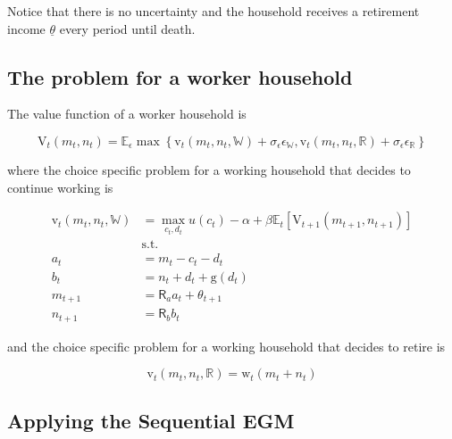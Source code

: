 \documentclass{article}
\newcommand{\DiscFac}{\beta}
\newcommand{\VFunc}{\mathrm{V}}
\newcommand{\util}{u}
\newcommand{\tShkEmp}{\theta}
\newcommand{\Ex}{\mathbb{E}}
\newcommand{\bRat}{b}
\newcommand{\cRat}{c}
\newcommand{\vFunc}{\mathrm{v}}
\newcommand{\Rfree}{\mathsf{R}}
\newcommand{\aRat}{a}
\newcommand{\mRat}{m}
\newcommand{\nRat}{n}
\newcommand{\dRat}{d}
\newcommand{\gFunc}{\mathrm{g}}
\newcommand{\wFunc}{\mathrm{w}}
\newcommand{\Retire}{\mathbb{R}}
\newcommand{\Work}{\mathbb{W}}
\newcommand{\error}{\epsilon}
\newcommand{\kapShare}{\alpha}
\begin{document}
Notice that there is no uncertainty and the household receives a retirement
income $\underline{\tShkEmp}$ every period until death.

\subsection{The problem for a worker household}\label{The problem for a worker household}

The value function of a worker household is

\begin{equation}
\VFunc_{t}(\mRat_{t}, \nRat_{t}) = \Ex_\error \max \left\{
    \vFunc_{t}(\mRat_{t}, \nRat_{t}, \Work) + \sigma_{\error}
    \error_{\Work} ,
    \vFunc_{t}(\mRat_{t}, \nRat_{t}, \Retire) + \sigma_{\error}
    \error_{\Retire} \right\}
\end{equation}

where the choice specific problem for a working household that decides to
continue working is

\begin{equation}
\begin{split}
        \vFunc_{t}(\mRat_{t}, \nRat_{t}, \Work) & = \max_{\cRat_{t},
            \dRat_{t}} \util(\cRat_{t}) - \kapShare + \DiscFac
        \Ex_{t} \left[
            \VFunc_{t+1}(\mRat_{t+1}, \nRat_{t+1})
            \right] \\
        & \text{s.t.} \\
        \aRat_{t} & = \mRat_{t} - \cRat_{t} - \dRat_{t} \\
        \bRat_{t} & = \nRat_{t} + \dRat_{t} + \gFunc(\dRat_{t}) \\
        \mRat_{t+1} & = \Rfree_{\aRat} \aRat_{t} + \tShkEmp_{t+1} \\
        \nRat_{t+1} & = \Rfree_{\bRat} \bRat_{t}
    \end{split}
\end{equation}

and the choice specific problem for a working household that decides to retire
is

\begin{equation}
\vFunc_{t}(\mRat_{t}, \nRat_{t}, \Retire) =
    \wFunc_{t}(\mRat_{t}+\nRat_{t})
\end{equation}

\subsection{Applying the Sequential EGM}\label{Applying the Sequential EGM}
\end{document}
